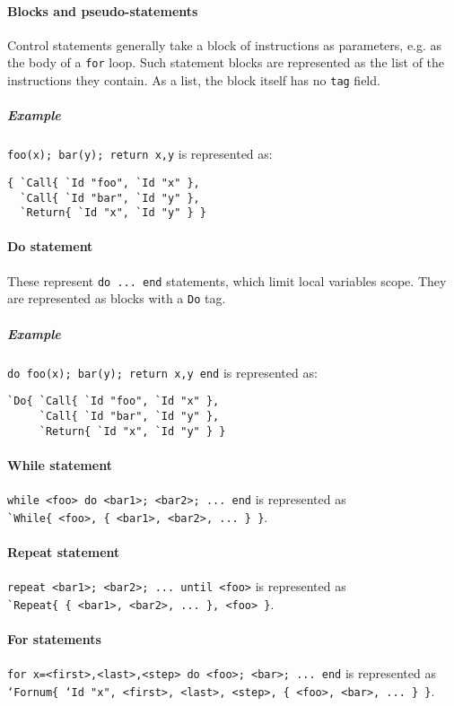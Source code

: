 \paragraph{Blocks and pseudo-statements}
Control statements generally take a block of instructions as
parameters, e.g. as the body of a \verb|for| loop. Such statement
blocks are represented as the list of the instructions they
contain. As a list, the block itself has no \verb|tag| field.

\subparagraph{Example}
\verb|foo(x); bar(y); return x,y| is represented as:
\begin{verbatim}
{ `Call{ `Id "foo", `Id "x" },
  `Call{ `Id "bar", `Id "y" },
  `Return{ `Id "x", `Id "y" } }
\end{verbatim}

\paragraph{Do statement}
These represent \verb|do ... end| statements, which limit local
variables scope. They are represented as
blocks with a \verb|Do| tag.

\subparagraph{Example}
\verb|do foo(x); bar(y); return x,y end| is represented as:
\begin{verbatim}
`Do{ `Call{ `Id "foo", `Id "x" },
     `Call{ `Id "bar", `Id "y" },
     `Return{ `Id "x", `Id "y" } }
\end{verbatim}

\paragraph{While statement}
\verb|while <foo> do <bar1>; <bar2>; ... end| is represented as \\
\verb|`While{ <foo>, { <bar1>, <bar2>, ... } }|.

\paragraph{Repeat statement} 
\verb|repeat <bar1>; <bar2>; ... until <foo>| is represented as \\
\verb|`Repeat{ { <bar1>, <bar2>, ... }, <foo> }|.

\paragraph{For statements}

{\tt for x=<first>,<last>,<step> do <foo>; <bar>; ... end} is
represented as {\tt `Fornum\{ `Id "x", <first>, <last>, <step>, \{
  <foo>, <bar>, ... \} \}}.

